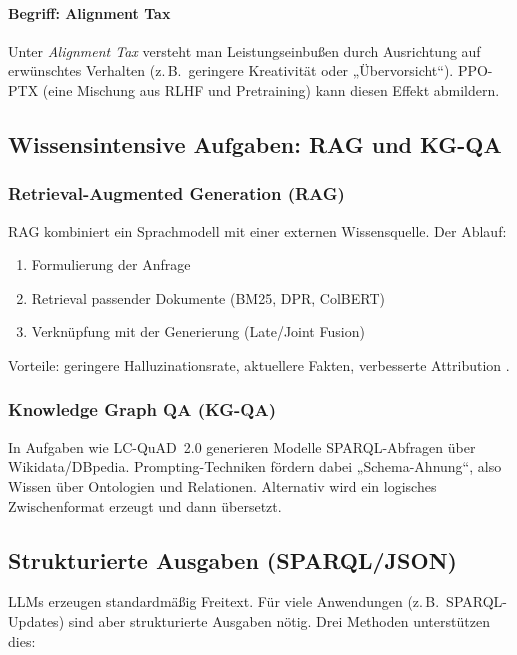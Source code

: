 \paragraph{Begriff: Alignment Tax}

Unter \emph{Alignment Tax} versteht man Leistungseinbußen durch Ausrichtung auf erwünschtes Verhalten (z.\,B.\ geringere Kreativität oder „Übervorsicht“). PPO-PTX (eine Mischung aus RLHF und Pretraining) kann diesen Effekt abmildern.

\subsection{Wissensintensive Aufgaben: RAG und KG-QA}

\subsubsection{Retrieval-Augmented Generation (RAG)}

RAG kombiniert ein Sprachmodell mit einer externen Wissensquelle. Der Ablauf:

\begin{enumerate}
    \item Formulierung der Anfrage
    \item Retrieval passender Dokumente (BM25, DPR, ColBERT)
    \item Verknüpfung mit der Generierung (Late/Joint Fusion)
\end{enumerate}

Vorteile: geringere Halluzinationsrate, aktuellere Fakten, verbesserte Attribution \cite{lewis2020rag}.

\subsubsection{Knowledge Graph QA (KG-QA)}

In Aufgaben wie LC-QuAD~2.0 \cite{dubey2019lcquad2} generieren Modelle SPARQL-Abfragen über Wikidata/DBpedia. Prompting-Techniken fördern dabei „Schema-Ahnung“, also Wissen über Ontologien und Relationen. Alternativ wird ein logisches Zwischenformat erzeugt und dann übersetzt.

\subsection{Strukturierte Ausgaben (SPARQL/JSON)}

LLMs erzeugen standardmäßig Freitext. Für viele Anwendungen (z.\,B.\ SPARQL-Updates) sind aber strukturierte Ausgaben nötig. Drei Methoden unterstützen dies:

